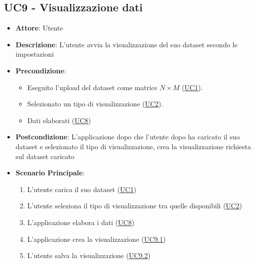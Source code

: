 \subsection{UC9 - Visualizzazione dati}
    \label{uc9}
    \begin{itemize}
    \item \textbf{Attore}: Utente
    \item \textbf{Descrizione}: L'utente avvia la visualizzazione del suo dataset secondo le impostazioni
    \item \textbf{Precondizione}: 
    \begin{itemize}
        \item Eseguito l'upload del dataset come matrice $N\times M$ (\hyperref[uc1]{UC1}).
        \item Selezionato un tipo di visualizzazione (\hyperref[uc2]{UC2}).
        \item Dati elaborati (\hyperref[uc8]{UC8})
    \end{itemize}  
    \item \textbf{Postcondizione}: L'applicazione dopo che l'utente dopo ha caricato il suo dataset e selezionato il tipo di visualizzazione, crea la visualizzazione richiesta sul dataset caricato
    \item \textbf{Scenario Principale}: 
    \begin{enumerate}
        \item L'utente carica il suo dataset (\hyperref[uc1]{UC1})
        \item L'utente seleziona il tipo di visualizzazione tra quelle disponibili (\hyperref[uc2]{UC2})
        \item L'applicazione elabora i dati (\hyperref[uc8]{UC8})
        \item L'applicazione crea la visualizzazione (\hyperref[uc9.1]{UC9.1})
        \item L'utente salva la visualizzazione (\hyperref[uc9.2]{UC9.2})
    \end{enumerate}
    \end{itemize}
    
